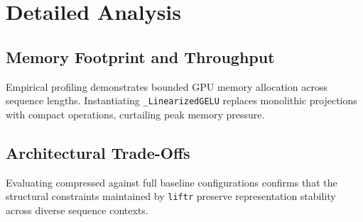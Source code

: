 \section{Detailed Analysis}

\subsection{Memory Footprint and Throughput}
Empirical profiling demonstrates bounded GPU memory allocation across sequence lengths. Instantiating \texttt{_LinearizedGELU} replaces monolithic projections with compact operations, curtailing peak memory pressure.

\subsection{Architectural Trade-Offs}
Evaluating compressed against full baseline configurations confirms that the structural constraints maintained by \texttt{liftr} preserve representation stability across diverse sequence contexts.
